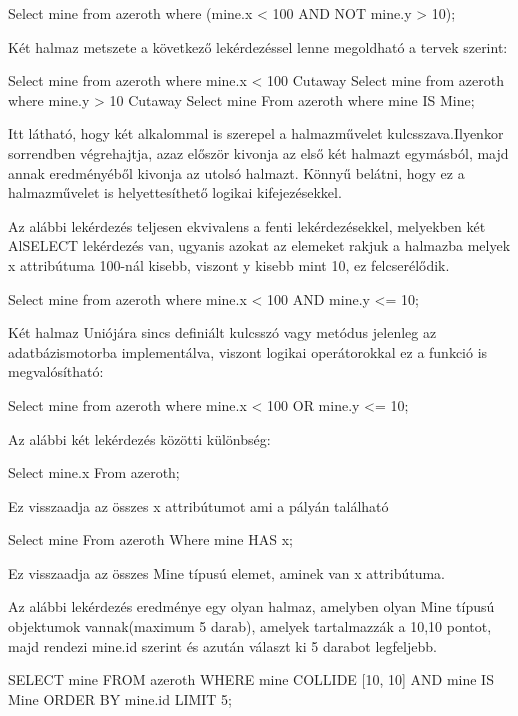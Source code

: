 \begin{sql}
\begin{sql}
Select mine from azeroth where (mine.x < 100 AND NOT mine.y > 10); 
\end{sql}

Két halmaz metszete a következő lekérdezéssel lenne megoldható a tervek szerint:
\begin{sql}
Select mine from azeroth where mine.x < 100 Cutaway Select mine from azeroth where mine.y > 10 Cutaway Select mine From azeroth where mine IS Mine;
\end{sql}
Itt látható, hogy két alkalommal is szerepel a halmazművelet kulcsszava.Ilyenkor sorrendben végrehajtja, azaz először kivonja az első két halmazt egymásból, majd annak eredményéből kivonja az utolsó halmazt.
Könnyű belátni, hogy ez a  halmazművelet is helyettesíthető logikai kifejezésekkel.


Az alábbi lekérdezés teljesen ekvivalens a fenti lekérdezésekkel, melyekben két AlSELECT lekérdezés van, ugyanis azokat az elemeket rakjuk a halmazba melyek x attribútuma 100-nál kisebb, viszont y kisebb mint 10, ez felcserélődik.
\begin{sql}
Select mine from azeroth where mine.x < 100 AND mine.y <= 10;
\end{sql}


Két halmaz Uniójára sincs definiált kulcsszó vagy metódus jelenleg az adatbázismotorba implementálva, viszont logikai operátorokkal ez a funkció is megvalósítható:
\begin{sql}
Select mine from azeroth where mine.x < 100 OR mine.y <= 10;
\end{sql}


Az alábbi két lekérdezés közötti különbség:
\begin{sql}
Select mine.x From azeroth; 
\end{sql}
Ez visszaadja az összes x attribútumot ami a pályán található
\begin{sql}
Select mine From azeroth Where mine HAS x;
\end{sql}
Ez visszaadja az összes Mine típusú elemet, aminek van x attribútuma.


Az alábbi lekérdezés eredménye egy olyan halmaz, amelyben olyan Mine típusú objektumok vannak(maximum 5 darab), amelyek tartalmazzák a 10,10 pontot, majd rendezi mine.id szerint és azután választ ki 5 darabot legfeljebb.
\begin{sql}
SELECT mine
FROM azeroth
WHERE mine COLLIDE [10, 10] AND mine IS Mine
ORDER BY mine.id
LIMIT 5;
\end{sql}



\end{sql}
